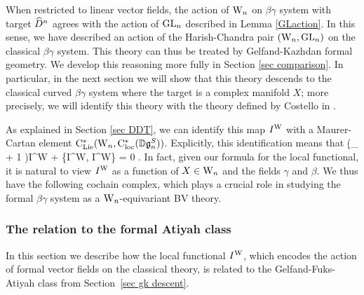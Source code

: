 \begin{rmk}
When restricted to linear vector fields, the action of ${{\rm W}_n}$ on $\beta\gamma$ system with target $\widehat{D}^n$ 
agrees with the action of ${\rm GL}_n$ described in Lemma \ref{GLaction}. In this sense, we have described an action of the Harish-Chandra pair $({{\rm W}_n}, {\rm GL}_n)$ on the classical $\beta\gamma$ system. 
This theory can thus be treated by Gelfand-Kazhdan formal geometry.
We develop this reasoning more fully in Section \ref{sec comparison}. 
In particular, in the next section we will show that this theory descends to the classical curved $\beta\gamma$ system where the target is a complex manifold $X$; more precisely, we will identify this theory with the theory defined by Costello in \cite{WG2}.
\end{rmk}



As explained in Section \ref{sec DDT}, we can identify this map
$I^{\rm W}$ with a Maurer-Cartan element ${\rm C}_{\rm Lie}^*({{\rm W}_n},
{\rm C}^*_{\rm loc}(\mathbb D\mathfrak{g}_n^S))$. Explicitly, this identification means that
\be\label{MC1}
(\d_{\Vect}  + 1 \tensor \dbar)I^{\rm W} +  \{I^{\rm W}, I^{\rm W}\} =
0 .
\ee
In fact, given our formula for the local functional, it is natural to view $I^{\rm W}$ as a function of $X \in {{\rm W}_n}$ and the fields $\gamma$ and $\beta$.
We thus have the following cochain complex, which plays a crucial role in studying the formal $\beta\gamma$ system as a ${{\rm W}_n}$-equivariant BV theory.

\subsubsection{The relation to the formal Atiyah class} \label{sec atiyah 2}

In this section we describe how the local functional $I^{\rm W}$, which encodes the action of formal vector fields on the classical theory, is related to the Gelfand-Fuks-Atiyah class from Section~\ref{sec gk descent}. 

